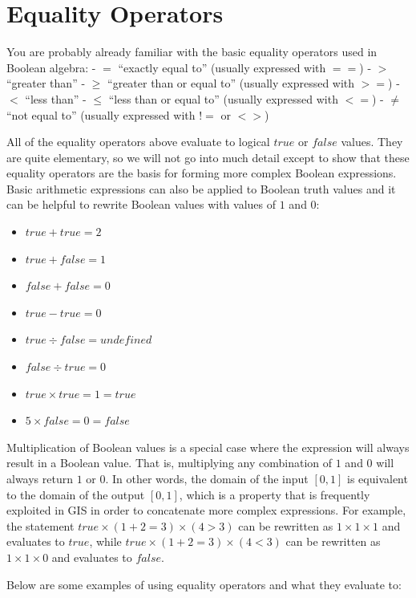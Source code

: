 \documentclass[
]{book}
\providecommand{\tightlist}{%
  \setlength{\itemsep}{0pt}\setlength{\parskip}{0pt}}
\begin{document}
\section{Equality Operators}\label{equality-operators}

You are probably already familiar with the basic equality operators used in Boolean algebra:
- \(=\) ``exactly equal to'' (usually expressed with \(==\))
- \(>\) ``greater than''
- \(≥\) ``greater than or equal to'' (usually expressed with \(>=\))
- \(<\) ``less than''
- \(≤\) ``less than or equal to'' (usually expressed with \(<=\))
- \(≠\) ``not equal to'' (usually expressed with \(!=\) or \(<>\))

All of the equality operators above evaluate to logical \(true\) or \(false\) values. They are quite elementary, so we will not go into much detail except to show that these equality operators are the basis for forming more complex Boolean expressions. Basic arithmetic expressions can also be applied to Boolean truth values and it can be helpful to rewrite Boolean values with values of \(1\) and \(0\):

\begin{itemize}
\tightlist
\item
  \(true+true=2\)
\item
  \(true+false=1\)
\item
  \(false+false=0\)
\item
  \(true-true=0\)
\item
  \(true÷false=undefined\)
\item
  \(false÷true=0\)
\item
  \(true×true=1=true\)
\item
  \(5×false=0=false\)
\end{itemize}

Multiplication of Boolean values is a special case where the expression will always result in a Boolean value. That is, multiplying any combination of \(1\) and \(0\) will always return \(1\) or \(0\). In other words, the domain of the input \([0,1]\) is equivalent to the domain of the output \([0,1]\), which is a property that is frequently exploited in GIS in order to concatenate more complex expressions. For example, the statement \(true×(1+2=3)×(4>3)\) can be rewritten as \(1×1×1\) and evaluates to \(true\), while \(true×(1+2=3)×(4<3)\) can be rewritten as \(1×1×0\) and evaluates to \(false\).

Below are some examples of using equality operators and what they evaluate to:
\end{document}
